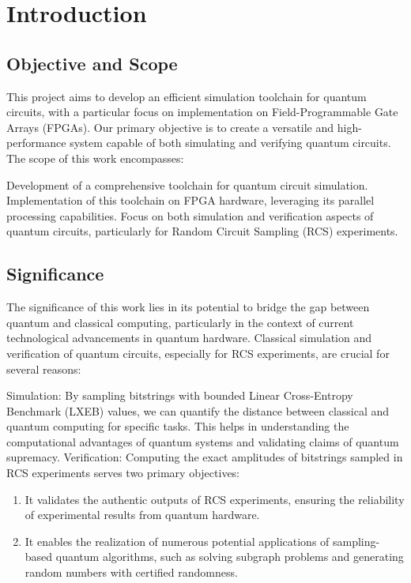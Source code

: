 \documentclass[12pt,oneside,a4paper]{article}
\begin{document}
\section{Introduction}

\subsection{Objective and Scope}
This project aims to develop an efficient simulation toolchain for quantum circuits, with a particular focus on implementation on Field-Programmable Gate Arrays (FPGAs). Our primary objective is to create a versatile and high-performance system capable of both simulating and verifying quantum circuits.
The scope of this work encompasses:

Development of a comprehensive toolchain for quantum circuit simulation.
Implementation of this toolchain on FPGA hardware, leveraging its parallel processing capabilities.
Focus on both simulation and verification aspects of quantum circuits, particularly for Random Circuit Sampling (RCS) experiments.

\subsection{Significance}
The significance of this work lies in its potential to bridge the gap between quantum and classical computing, particularly in the context of current technological advancements in quantum hardware.
Classical simulation and verification of quantum circuits, especially for RCS experiments, are crucial for several reasons:

Simulation: By sampling bitstrings with bounded Linear Cross-Entropy Benchmark (LXEB) values, we can quantify the distance between classical and quantum computing for specific tasks. This helps in understanding the computational advantages of quantum systems and validating claims of quantum supremacy.
Verification: Computing the exact amplitudes of bitstrings sampled in RCS experiments serves two primary objectives:
\begin{enumerate}
	\item It validates the authentic outputs of RCS experiments, ensuring the reliability of experimental results from quantum hardware.
	\item It enables the realization of numerous potential applications of sampling-based quantum algorithms, such as solving subgraph problems and generating random numbers with certified randomness.
\end{enumerate}
\end{document}
